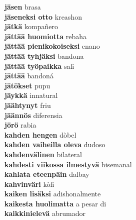 \textbf{ jäsen  } brasa \\
\textbf{ jäseneksi otto  } kreashon \\
\textbf{ jätkä  } kompañero \\
\textbf{ jättää huomiotta  } rebaha \\
\textbf{ jättää pienikokoiseksi  } enano \\
\textbf{ jättää tyhjäksi  } bandona \\
\textbf{ jättää työpaikka  } sali \\
\textbf{ jättää  } bandoná \\
\textbf{ jätökset  } pupu \\
\textbf{ jäykkä  } innatural \\
\textbf{ jäähtynyt  } friu \\
\textbf{ jäännös  } diferensia \\
\textbf{ jörö  } rabia \\
\textbf{ kahden hengen  } dòbel \\
\textbf{ kahden vaiheilla oleva  } dudoso \\
\textbf{ kahdenvälinen  } bilateral \\
\textbf{ kahdesti viikossa ilmestyvä  } bisemanal \\
\textbf{ kahlata eteenpäin  } dalbay \\
\textbf{ kahvinväri  } kòfi \\
\textbf{ kaiken lisäksi  } adishonalmente \\
\textbf{ kaikesta huolimatta  } a pesar di \\
\textbf{ kaikkinielevä  } abrumador \\
